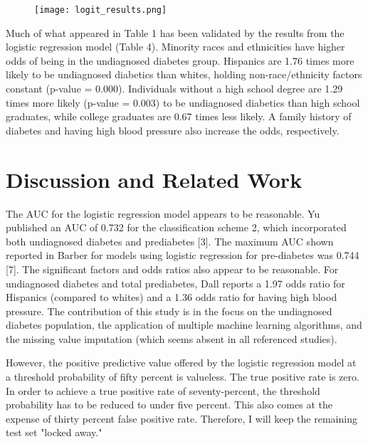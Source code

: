 \documentclass[twoside,11pt]{article}
\begin{document}
\begin{figure}[htbp]
  \centering 
  \texttt{[image: logit\_results.png]} 
  \label{fig:6} 
\end{figure} 

Much of what appeared in Table 1 has been validated by the results from the logistic regression model (Table 4). Minority races and ethnicities have higher odds of being in the undiagnosed diabetes group. Hispanics are 1.76 times more likely to be undiagnosed diabetics than whites, holding non-race/ethnicity factors constant (p-value = 0.000). Individuals without a high school degree are 1.29 times more likely (p-value = 0.003) to be undiagnosed diabetics than high school graduates, while college graduates are 0.67 times less likely. A family history of diabetes and having high blood pressure also increase the odds, respectively. 

\section{Discussion and Related Work} 

The AUC for the logistic regression model appears to be reasonable. Yu published an AUC of 0.732 for the classification scheme 2, which incorporated both undiagnosed diabetes and prediabetes [3]. The maximum AUC shown reported in Barber for models using logistic regression for pre-diabetes was 0.744 [7]. The significant factors and odds ratios also appear to be reasonable. For undiagnosed diabetes and total prediabetes, Dall reports a 1.97 odds ratio for Hispanics (compared to whites) and a 1.36 odds ratio for having high blood pressure. The contribution of this study is in the focus on the undiagnosed diabetes population, the application of multiple machine learning algorithms, and the missing value imputation (which seems absent in all referenced studies). 

However, the positive predictive value offered by the logistic regression model at a threshold probability of fifty percent is valueless. The true positive rate is zero. In order to achieve a true positive rate of seventy-percent, the threshold probability has to be reduced to under five percent. This also comes at the expense of thirty percent false positive rate. Therefore, I will keep the remaining test set "locked away." 
\end{document}
